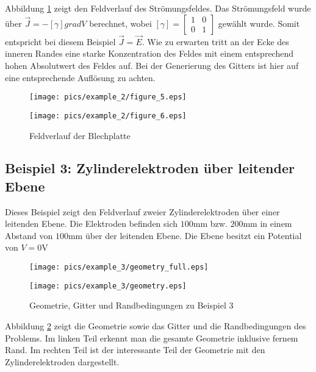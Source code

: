 Abbildung \ref{fig:metal_plate_field} zeigt den Feldverlauf des Strömungsfeldes. Das Strömungsfeld wurde über $\vec{J} = -[\gamma] \mathit{grad}V$ berechnet, wobei $[\gamma] = \begin{bmatrix}1 & 0 \\ 0 & 1\end{bmatrix}$ gewählt wurde. Somit entspricht bei diesem Beispiel $\vec{J} = \vec{E}$.\newline
Wie zu erwarten tritt an der Ecke des inneren Randes eine starke Konzentration des Feldes mit einem entsprechend hohen Absolutwert des Feldes auf. Bei der Generierung des Gitters ist hier auf eine entsprechende Auflösung zu achten.
\begin{figure}[htbp]
	\begin{minipage}{0.5\textwidth}
		\texttt{[image: pics/example\_2/figure\_5.eps]}
	\end{minipage}
	\begin{minipage}{0.5\textwidth}
		\texttt{[image: pics/example\_2/figure\_6.eps]}
	\end{minipage}
	\caption{Feldverlauf der Blechplatte}
	\label{fig:metal_plate_field}
\end{figure}


\subsection{Beispiel 3: Zylinderelektroden über leitender Ebene}
Dieses Beispiel zeigt den Feldverlauf zweier Zylinderelektroden über einer leitenden Ebene. Die Elektroden befinden sich $100 \si{\milli\meter}$ bzw. $200 \si{\milli\meter}$ in einem Abstand von $100 \si{\milli\meter}$ über der leitenden Ebene. Die Ebene besitzt ein Potential von $V = 0 \si{\volt}$

\begin{figure}[H]
	\begin{minipage}{0.5\textwidth}
		\texttt{[image: pics/example\_3/geometry\_full.eps]}
	\end{minipage}
	\begin{minipage}{0.5\textwidth}
		\texttt{[image: pics/example\_3/geometry.eps]}
	\end{minipage}
	\caption{Geometrie, Gitter und Randbedingungen zu Beispiel 3}
	\label{fig:example_3_geometry}
\end{figure}

Abbildung \ref{fig:example_3_geometry} zeigt die Geometrie sowie das Gitter und die Randbedingungen des Problems. Im linken Teil erkennt man die gesamte Geometrie inklusive fernem Rand. Im rechten Teil ist der interessante Teil der Geometrie mit den Zylinderelektroden dargestellt. 


